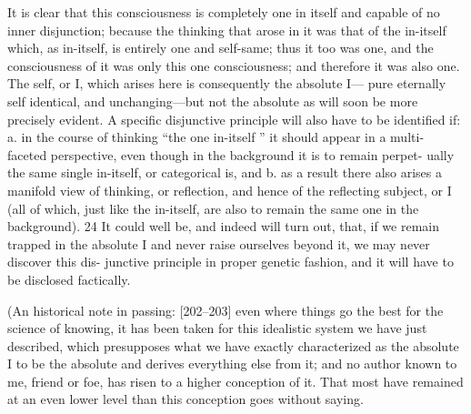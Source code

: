 It is clear that this consciousness is completely one in itself and capable
of no inner disjunction; because the thinking that arose in it was that of the
in-itself which, as in-itself, is entirely one and self-same; thus it too was one,
and the consciousness of it was only this one consciousness; and therefore it
was also one.
The self, or I, which arises here is consequently the absolute I—
pure eternally self identical, and unchanging—but not the absolute as will soon
be more precisely evident.
A specific disjunctive principle will also have to be
identified if:
a.
in the course of thinking “the one in-itself ” it should appear in a multi-
faceted perspective, even though in the background it is to remain perpet-
ually the same single in-itself, or categorical is, and
b.
as a result there also arises a manifold view of thinking, or reflection, and
hence of the reflecting subject, or I (all of which, just like the in-itself, are
also to remain the same one in the background).
24
It could well be, and indeed will turn out, that, if we remain trapped in the
absolute I and never raise ourselves beyond it, we may never discover this dis-
junctive principle in proper genetic fashion, and it will have to be disclosed
factically.

(An historical note in passing: [202–203] even where things go the best
for the science of knowing, it has been taken for this idealistic system we have
just described, which presupposes what we have exactly characterized as the
absolute I to be the absolute and derives everything else from it; and no author
known to me, friend or foe, has risen to a higher conception of it.
That most
have remained at an even lower level than this conception goes without saying.

